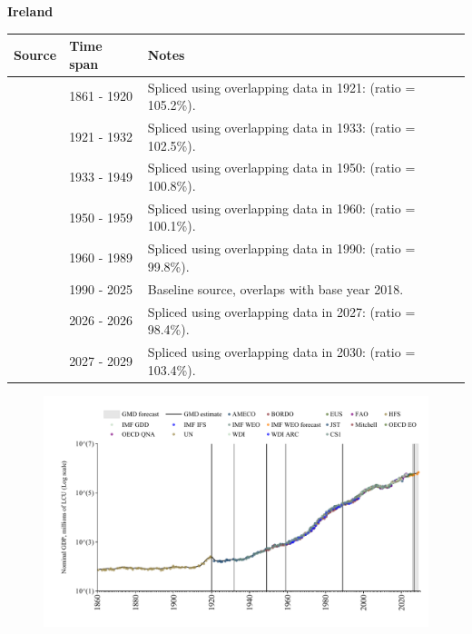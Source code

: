 \documentclass[12pt,a4paper,landscape]{article}
\begin{document}
\begin{adjustbox}{max totalsize={\paperwidth}{\paperheight},center}
\begin{minipage}[t][\textheight][t]{\textwidth}
\vspace*{0.5cm}
{}
\begin{center}
{\Large\bfseries Ireland}
\end{center}
\vspace{0.5cm}
\begin{table}[H]
\centering
\small
\begin{tabular}{|l|l|l|}
\hline
\textbf{Source} & \textbf{Time span} & \textbf{Notes} \\
\hline
\rowcolor{white}\cite{HFS}& 1861 - 1920 &Spliced using overlapping data in 1921: (ratio = 105.2\%).\\
\rowcolor{lightgray}\cite{JST}& 1921 - 1932 &Spliced using overlapping data in 1933: (ratio = 102.5\%).\\
\rowcolor{white}\cite{CS1_IRL}& 1933 - 1949 &Spliced using overlapping data in 1950: (ratio = 100.8\%).\\
\rowcolor{lightgray}\cite{IMF_GDD}& 1950 - 1959 &Spliced using overlapping data in 1960: (ratio = 100.1\%).\\
\rowcolor{white}\cite{AMECO}& 1960 - 1989 &Spliced using overlapping data in 1990: (ratio = 99.8\%).\\
\rowcolor{lightgray}\cite{OECD_EO}& 1990 - 2025 &Baseline source, overlaps with base year 2018.\\
\rowcolor{white}\cite{AMECO}& 2026 - 2026 &Spliced using overlapping data in 2027: (ratio = 98.4\%).\\
\rowcolor{lightgray}\cite{IMF_WEO_forecast}& 2027 - 2029 &Spliced using overlapping data in 2030: (ratio = 103.4\%).\\
\hline
\end{tabular}
\end{table}
\begin{figure}[H]
\centering
\includegraphics[width=\textwidth,height=0.6\textheight,keepaspectratio]{graphs/IRL_nGDP.pdf}
\end{figure}
\end{minipage}
\end{adjustbox}
\end{document}
